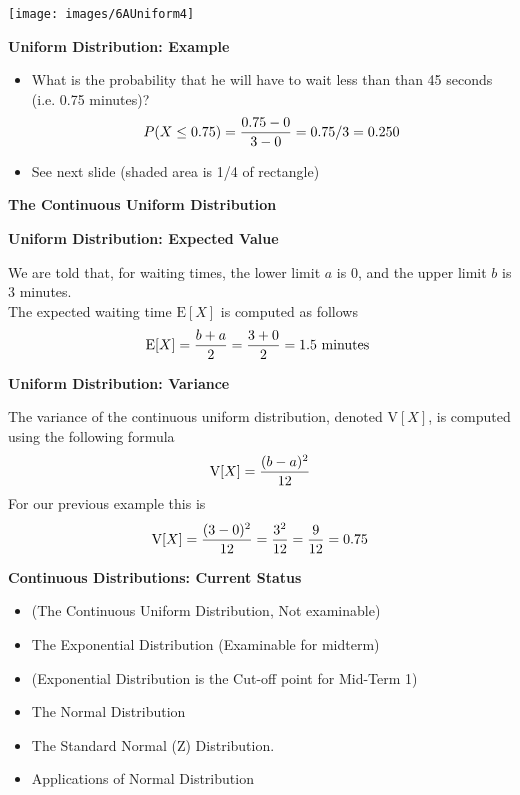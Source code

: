 \begin{center}
\texttt{[image: images/6AUniform4]}

\end{center}
\medskip
{
\textbf{Uniform Distribution: Example}

\begin{itemize}
\item What is the probability that he will have to wait less than than 45 seconds (i.e. 0.75 minutes)?
\[ P(X \leq 0.75)  = {0.75 - 0 \over 3-0} = {0.75/3} = 0.250  \]

\item See next slide (shaded area is 1/4 of rectangle)
\end{itemize}

}




\textbf{The Continuous Uniform Distribution}



\begin{center}

\end{center}
\medskip
{
\textbf{Uniform Distribution: Expected Value}

We are told that, for waiting times,  the lower limit $a$ is 0, and the upper limit $b$ is 3 minutes. \\ \bigskip The expected waiting time $\textrm{E}[X]$ is computed as follows
\vspace{0.1cm}
\[
\textrm{E}[X] = {b + a \over 2} =  {3 + 0  \over 2}  = 1.5 \mbox{ minutes }
\]

}
{\textbf{Uniform Distribution: Variance}

The variance of the continuous uniform distribution, denoted $\textrm{V}[X]$,  is  computed using the following formula
\vspace{0.1cm}
\[
\textrm{V}[X] = {(b - a)^2 \over 12}
\]
\vspace{0.1cm}
For our previous example this is
\[
\textrm{V}[X] = {(3 - 0)^2 \over 12} =  {3^2 \over 12} = {9 \over 12} = 0.75
\]
}

\textbf{Continuous Distributions: Current Status}
\begin{itemize}
\item (The Continuous Uniform Distribution, Not examinable)
\item The Exponential Distribution (Examinable for midterm)
\item (Exponential Distribution is the Cut-off point for Mid-Term 1)
\item The Normal Distribution
\item The Standard Normal (Z) Distribution.
\item Applications of Normal Distribution
\end{itemize}
\medskip



